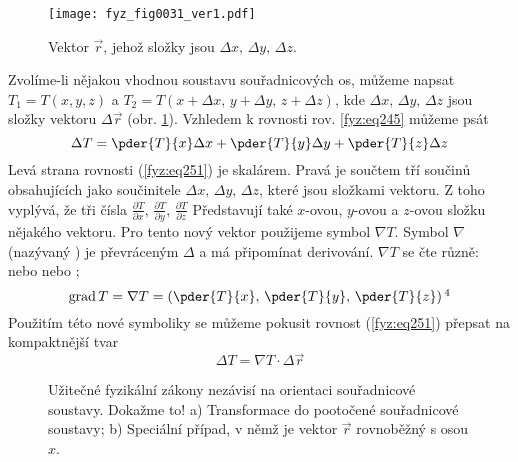       \begin{figure}[ht!]  %
        \centering
        \texttt{[image: fyz\_fig0031\_ver1.pdf]}
        \caption{Vektor $\vec{r}$, jehož složky jsou $\Delta x,\,\Delta y,\,\Delta z$.}
        \label{fyz:fig0031}
      \end{figure}
      Zvolíme-li nějakou vhodnou soustavu souřadnicových os, můžeme napsat $T_1=T(x,y,z)$ a 
      $T_2=T(x+\Delta x,\,y+\Delta y,\,z+\Delta z)$, kde $\Delta x,\,\Delta y,\,\Delta z$ jsou složky 
      vektoru $\Delta \vec{r}$ (obr. \ref{fyz:fig0031}). Vzhledem k rovnosti rov. 
      \ref{fyz:eq245} můžeme psát    
      \begin{equation}\label{fyz:eq251}
        \Delta T = \pder{T}{x}\Delta x + \pder{T}{y}\Delta y + \pder{T}{z}\Delta z
      \end{equation}
      Levá strana rovnosti (\ref{fyz:eq251}) je skalárem. Pravá je součtem tří součinů obsahujících 
      jako součinitele $\Delta x,\,\Delta y,\,\Delta z$, které jsou složkami vektoru. Z toho vyplývá, 
      že tři čísla \(\frac{\partial T}{\partial x},\,\frac{\partial T}{\partial y},\,\frac{\partial 
      T}{\partial z}\) Představují také \(x\)-ovou, \(y\)-ovou a \(z\)-ovou složku nějakého vektoru. 
      Pro tento nový vektor použijeme symbol \(\nabla T\). Symbol \(\nabla\) (nazývaný ) je 
      převráceným \(\Delta\) a má připomínat derivování. \(\nabla T\) se čte různě: \emph{} nebo \emph{} nebo \emph{};
      \begin{equation}\label{fyz:eq252}
        \mathrm{grad}\,T =\nabla T = \left(\pder{T}{x},\, \pder{T}{y},\,\pder{T}{z} \right)
        \protect\footnotemark[4]
      \end{equation}
      Použitím této nové symboliky se můžeme pokusit rovnost (\ref{fyz:eq251}) 
      přepsat na kompaktnější tvar
      \begin{equation}\label{fyz:eq257}
        \Delta T = \nabla T \cdot\Delta\vec{r}
      \end{equation}        
  
      \begin{figure}[ht!]
        \centering
        \caption{Užitečné fyzikální zákony nezávisí na orientaci souřadnicové soustavy. Dokažme to!
                  a) Transformace do pootočené souřadnicové soustavy; b) Speciální případ, v němž je 
                  vektor \(\vec{r}\) rovnoběžný s osou \(x\).
                  \cite[s.~33]{Feynman02}}
        \label{fyz:fig0154}
      \end{figure}
  
